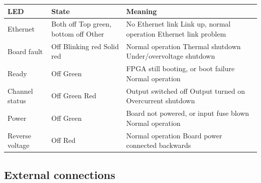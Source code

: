 \documentclass{article}
\begin{document}
\begin{longtable}{|l|p{1.25in}|p{2.25in}|}
\hline
{\bf LED} & {\bf State} & {\bf Meaning}\\
\hline
Ethernet &
	Both off \newline
		Top green, bottom off \newline
		Other &
	No Ethernet link \newline
		Link up, normal operation \newline
		Ethernet link problem \\
\hline
Board fault &
	Off \newline
		Blinking red \newline
		Solid red &
	Normal operation \newline
		Thermal shutdown \newline
		Under/overvoltage shutdown \\
\hline
Ready & 
	Off \newline
		Green &
	FPGA still booting, or boot failure \newline
	Normal operation \\
\hline
Channel status & 
	Off \newline
		Green \newline
		Red &
	Output switched off \newline
		Output turned on \newline
		Overcurrent shutdown \\
\hline
Power &
	Off \newline
		Green &
	Board not powered, or input fuse blown \newline
		Normal operation \\
\hline
Reverse voltage &
	Off \newline
		Red &
	Normal operation \newline
		Board power connected backwards \\
\hline
\end{longtable}

\subsection{External connections}
\end{document}
